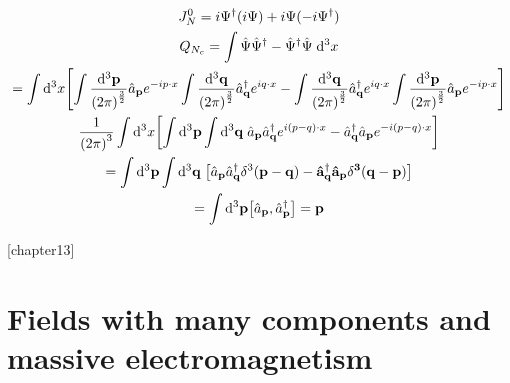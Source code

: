 \documentclass{report}
\theoremstyle{definition}
\begin{document}
\begin{chapter12}
	\begin{gather*}
		J^0_N = i\Psi^{\dagger}(i\Psi) + i\Psi(-i\Psi^{\dagger}) \\
		Q_{N_c} = \int \hat{\Psi}\hat{\Psi}^{\dagger} - \hat{\Psi}^{\dagger}\hat{\Psi}\;\dd^3{x} \\
		= \int \dd^3{x}\bqty{\int \frac{\dd^3{\bf p}}{\pqty{2\pi}^{\frac{3}{2}}}\hat{a}_{\bf p}e^{-ip\cdot x}\int \frac{\dd^3{\bf q}}{\pqty{2\pi}^{\frac{3}{2}}}\hat{a}^{\dagger}_{\bf q}e^{iq\cdot x} - \int \frac{\dd^3{\bf q}}{\pqty{2\pi}^{\frac{3}{2}}}\hat{a}^{\dagger}_{\bf q}e^{iq\cdot x}\int \frac{\dd^3{\bf p}}{\pqty{2\pi}^{\frac{3}{2}}}\hat{a}_{\bf p}e^{-ip\cdot x}} \\
		\frac{1}{\pqty{2\pi}^3}\int \dd^3{x}\bqty{\int \dd^3{\bf p}\int \dd^3{\bf q}\;\hat{a}_{\bf p}\hat{a}^{\dagger}_{\bf q}e^{i(p-q)\cdot x} - \hat{a}^{\dagger}_{\bf q}\hat{a}_{\bf p}e^{-i(p-q)\cdot x}} \\
		= \int \dd^3{\bf p}\int \dd^3{\bf q}\;\bqty{\hat{a}_{\bf p}\hat{a}^{\dagger}_{\bf q}\delta^3(\bf p - q) - \hat{a}^{\dagger}_{\bf q}\hat{a}_{\bf p}\delta^3(\bf q - p)} \\
		= \int \dd^3{\bf p}\bqty{\hat{a}_{\bf p},\hat{a}^{\dagger}_{\bf p}} = \bf p
	\end{gather*}	
\end{chapter12}

\newtheorem{chapter13}{Problem}
[chapter13]
\chapter{Fields with many components and massive electromagnetism}
\end{document}
